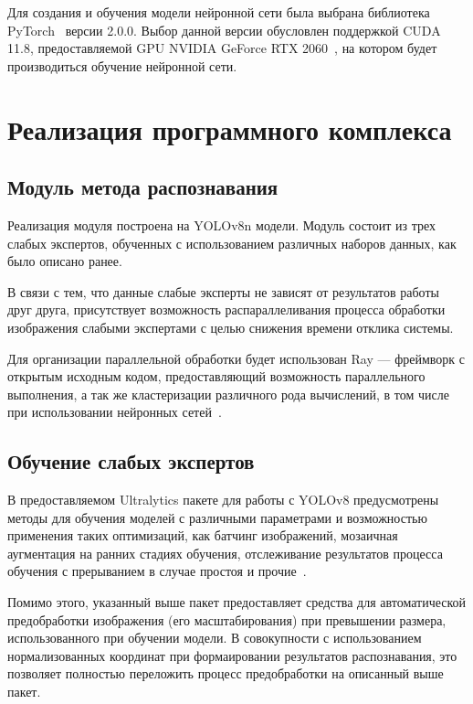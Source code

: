 Для создания и обучения модели нейронной сети была выбрана библиотека PyTorch~\cite{pytorch} версии 2.0.0. Выбор данной версии обусловлен поддержкой CUDA 11.8, предоставляемой GPU NVIDIA GeForce RTX 2060~\cite{rtx2060}, на котором будет производиться обучение нейронной сети.

\section{Реализация программного комплекса}

\subsection{Модуль метода распознавания}

Реализация модуля построена на YOLOv8n модели. Модуль состоит из трех слабых экспертов, обученных с использованием различных наборов данных, как было описано ранее.

В связи с тем, что данные слабые эксперты не зависят от результатов работы друг друга, присутствует возможность распараллеливания процесса обработки изображения слабыми экспертами с целью снижения времени отклика системы.

Для организации параллельной обработки будет использован Ray --- фреймворк с открытым исходным кодом, предоставляющий возможность параллельного выполнения, а так же кластеризации различного рода вычислений, в том числе при использовании нейронных сетей~\cite{pkg-ray}. 

\subsection{Обучение слабых экспертов}

В предоставляемом Ultralytics пакете для работы с YOLOv8 предусмотрены методы для обучения моделей с различными параметрами и возможностью применения таких оптимизаций, как батчинг изображений, мозаичная аугментация на ранних стадиях обучения, отслеживание результатов процесса обучения с прерыванием в случае простоя и прочие~\cite{pkg-ultralytics}.

Помимо этого, указанный выше пакет предоставляет средства для автоматической предобработки изображения (его масштабирования) при превышении размера, использованного при обучении модели. В совокупности с использованием нормализованных координат при формаировании результатов распознавания, это позволяет полностью переложить процесс предобработки на описанный выше пакет.

